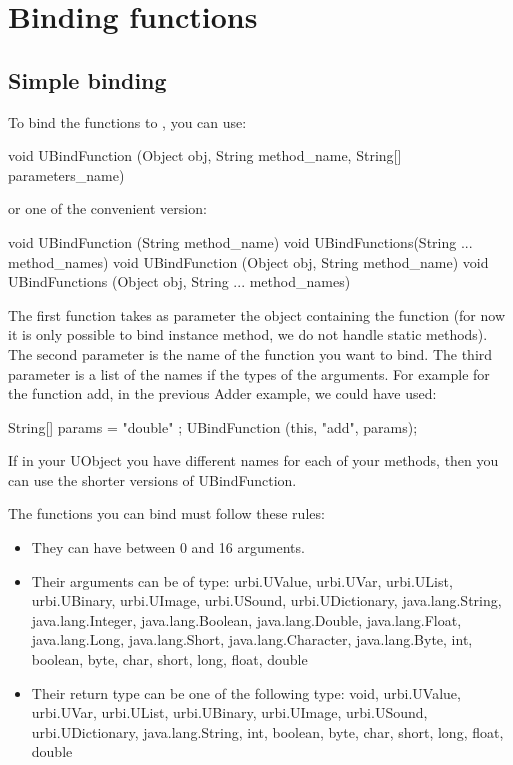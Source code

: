 \section{Binding functions}
\label{sec:uob:apijava:func}

\subsection{Simple binding}

To bind the functions to \urbi, you can use:
\begin{cxx}
void UBindFunction (Object obj, String method_name, String[] parameters_name)
\end{cxx}
or one of the convenient version:
\begin{cxx}
void UBindFunction (String method_name)
void UBindFunctions(String ... method_names)
void UBindFunction (Object obj, String method_name)
void UBindFunctions (Object obj, String ... method_names)
\end{cxx}

The first function takes as parameter the object containing the function
(for now it is only possible to bind instance method, we do not handle static
methods). The second parameter is the name of the function you want to bind.
The third parameter is a list of the names if the types of the arguments.
For example for the function add, in the previous Adder example, we could have
used:

\begin{cxx}
String[] params = { "double" };
UBindFunction (this, "add", params);
\end{cxx}

If in your UObject you have different names for each of your methods, then
you can use the shorter versions of UBindFunction.

The functions you can bind must follow these rules:
\begin{itemize}
\item They can have between 0 and 16 arguments.
\item Their arguments can be of type: urbi.UValue, urbi.UVar, urbi.UList,
  urbi.UBinary, urbi.UImage, urbi.USound, urbi.UDictionary,
  java.lang.String, java.lang.Integer, java.lang.Boolean, java.lang.Double,
  java.lang.Float, java.lang.Long, java.lang.Short, java.lang.Character,
  java.lang.Byte, int, boolean, byte, char, short, long, float, double
\item Their return type can be one of the following type:
 void, urbi.UValue, urbi.UVar, urbi.UList,
 urbi.UBinary, urbi.UImage, urbi.USound,
 urbi.UDictionary, java.lang.String, int, boolean,
 byte, char, short, long, float, double
\end{itemize}



